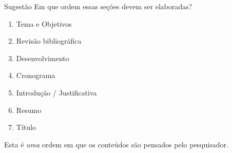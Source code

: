 \documentclass{beamer}
\begin{document}


\begin{frame}{Sugestão}
  \footnotesize
Em que ordem essas seções devem ser elaboradas?
\begin{enumerate}
  \footnotesize
\item Tema e Objetivos
\item Revisão bibliográfica
\item Desenvolvimento
\item Cronograma
\item Introdução / Justificativa
\item Resumo
\item Título
\end{enumerate}

\vfill
Esta é {\em uma} ordem em que os conteúdos são pensados pelo pesquisador.

\end{frame}

\end{document}
